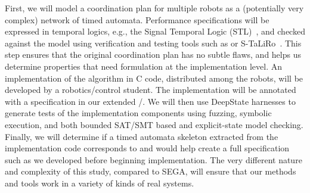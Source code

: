 First, we will model a coordination plan %
for multiple robots as a (potentially very complex) network of timed automata.
Performance specifications will be expressed in temporal logics, e.g., the Signal Temporal Logic (STL)~\cite{donze2010robust}, and checked against the model using verification and testing tools such as \uppaal or S-TaLiRo~\cite{annpureddy2011s}.
This step ensures that the original coordination plan has no subtle flaws, and helps us determine properties that need formulation at the implementation level.
An implementation of the algorithm in C code, distributed among the robots, will be developed by a robotics/control student.
The implementation will be annotated with a specification in our extended \acsl/\eacsl.
We will then use DeepState harnesses to generate tests of the implementation components using fuzzing, symbolic execution, and both bounded SAT/SMT based and explicit-state model checking.  Finally, we will determine if a timed automata skeleton extracted from the implementation code corresponds to and would help create a full specification such as we developed before beginning implementation.
The very different nature and complexity of this study, compared to SEGA, will ensure that our methods and tools work in a variety of kinds of real systems.


